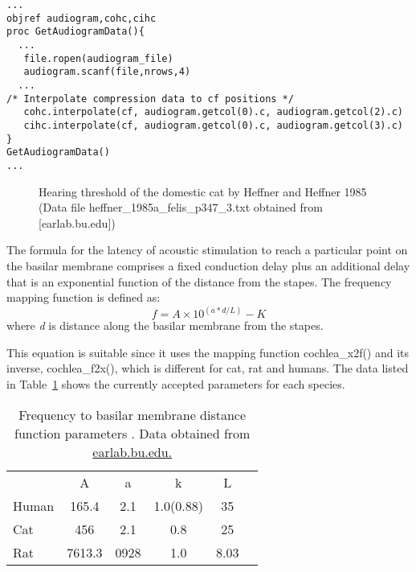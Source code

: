 \begin{lstlisting}[label=lst:getaudiogramdata,caption= Procedure to get audiogram data and interpolate to freuencies in \textsf{cf} vector (Utilities.hoc)]
...
objref audiogram,cohc,cihc
proc GetAudiogramData(){
  ...
   file.ropen(audiogram_file)
   audiogram.scanf(file,nrows,4)
  ...
/* Interpolate compression data to cf positions */
   cohc.interpolate(cf, audiogram.getcol(0).c, audiogram.getcol(2).c)
   cihc.interpolate(cf, audiogram.getcol(0).c, audiogram.getcol(3).c)
}
GetAudiogramData() 
...
\end{lstlisting}

\medskip{}

\begin{figure}[htb]
\begin{center}
\caption{Hearing threshold of the domestic cat by Heffner and Heffner
  1985 \citep{HeffnerHeffner:1985} (Data file
  \mbox{heffner\_1985a\_felis\_p347\_3.txt} obtained from [earlab.bu.edu])}
\label{fig:AudThresholdRat}
\end{center}
\end{figure}


The formula for the latency of acoustic stimulation to reach a
particular point on the basilar membrane comprises a fixed conduction
delay plus an additional delay that is an exponential function of the
distance from the stapes. The frequency mapping function is defined
as:
\[
 f = A\times10^{\left(a*d/L\right)} - K
 \]
where \emph{d} is distance along the basilar membrane from the stapes.

\medskip{}

This equation is suitable since it uses the mapping function
\mbox{\textsf{cochlea\_x2f()}} and its inverse, \mbox{\textsf{cochlea\_f2x()}}, which is
different for cat, rat and humans.  The data listed in
Table~\ref{tab:f2x} shows the currently accepted parameters for each
species.


\begin{table}[h]
  \centering
  \begin{tabular}{lccccc}
    \hline
& A & a & k & L \\
Human &165.4	&2.1	&1.0(0.88)	&35     \\
Cat&456&	2.1&0.8&25 \\
Rat&7613.3	&0928	&1.0&	8.03     \\
    \hline
  \end{tabular}
  \caption{Frequency to basilar membrane distance function parameters \citep{FitzGeraldBurkittEtAl:2001}. Data obtained from \url{earlab.bu.edu.}}\label{tab:f2x}
\end{table}


